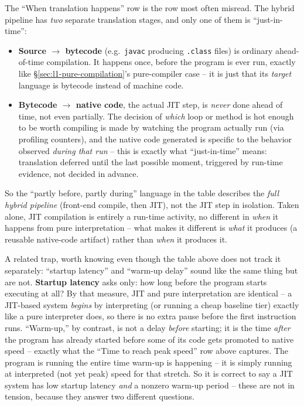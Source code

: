 \documentclass[full-course-notes.tex]{subfiles}
\begin{document}
\begin{examfocus}
The ``When translation happens'' row is the row most often misread. The hybrid pipeline has
\emph{two} separate translation stages, and only one of them is ``just-in-time'':
\begin{itemize}
  \item \textbf{Source $\to$ bytecode} (e.g.\ \texttt{javac} producing \texttt{.class} files) is
  ordinary ahead-of-time compilation. It happens once, before the program is ever run, exactly
  like \S\ref{sec:l1-pure-compilation}'s pure-compiler case -- it is just that its \emph{target}
  language is bytecode instead of machine code.
  \item \textbf{Bytecode $\to$ native code}, the actual JIT step, is \emph{never} done ahead of
  time, not even partially. The decision of \emph{which} loop or method is hot enough to be
  worth compiling is made by watching the program actually run (via profiling counters), and the
  native code generated is specific to the behavior observed \emph{during that run} -- this is
  exactly what ``just-in-time'' means: translation deferred until the last possible moment,
  triggered by run-time evidence, not decided in advance.
\end{itemize}
So the ``partly before, partly during'' language in the table describes the \emph{full hybrid
pipeline} (front-end compile, then JIT), not the JIT step in isolation. Taken alone, JIT
compilation is entirely a run-time activity, no different in \emph{when} it happens from pure
interpretation -- what makes it different is \emph{what} it produces (a reusable native-code
artifact) rather than \emph{when} it produces it.
\end{examfocus}

\begin{examfocus}
A related trap, worth knowing even though the table above does not track it separately:
``startup latency'' and ``warm-up delay'' sound like the same thing but are not. \textbf{Startup
latency} asks only: how long before the program starts executing at all? By that measure, JIT
and pure interpretation are identical -- a JIT-based system \emph{begins} by interpreting (or
running a cheap baseline tier) exactly like a pure interpreter does, so there is no extra pause
before the first instruction runs. ``Warm-up,'' by contrast, is not a delay \emph{before}
starting; it is the time \emph{after} the program has already started before some of its code
gets promoted to native speed -- exactly what the ``Time to reach peak speed'' row above
captures. The program is running the entire time warm-up is happening -- it is simply running at
interpreted (not yet peak) speed for that stretch. So it is correct to say a JIT system has low
startup latency \emph{and} a nonzero warm-up period -- these are not in tension, because they
answer two different questions.
\end{examfocus}
\end{document}
